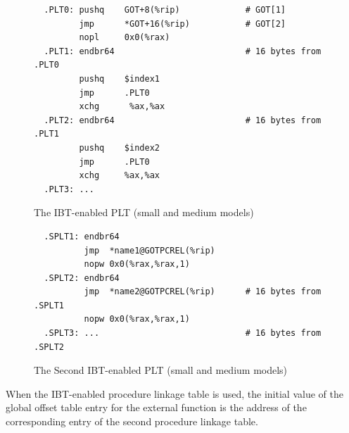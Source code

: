 \begin{figure}[H]
\Hrule
\caption{The IBT-enabled PLT (small and medium models)}
\label{ibt_small_med_plt}
\begin{footnotesize}
\begin{verbatim}
  .PLT0: pushq    GOT+8(%rip)             # GOT[1]
         jmp      *GOT+16(%rip)           # GOT[2]
         nopl     0x0(%rax)
  .PLT1: endbr64                          # 16 bytes from .PLT0
         pushq    $index1
         jmp      .PLT0
         xchg      %ax,%ax
  .PLT2: endbr64                          # 16 bytes from .PLT1
         pushq    $index2
         jmp      .PLT0
         xchg     %ax,%ax
  .PLT3: ...
\end{verbatim}
\end{footnotesize}
\Hrule
\end{figure}

\begin{figure}[H]
\Hrule
\caption{The Second IBT-enabled PLT (small and medium models)}
\label{ibt_sec_small_med_plt}
\begin{footnotesize}
\begin{verbatim}
  .SPLT1: endbr64
          jmp  *name1@GOTPCREL(%rip)
          nopw 0x0(%rax,%rax,1)
  .SPLT2: endbr64
          jmp  *name2@GOTPCREL(%rip)      # 16 bytes from .SPLT1
          nopw 0x0(%rax,%rax,1)
  .SPLT3: ...                             # 16 bytes from .SPLT2
\end{verbatim}
\end{footnotesize}
\Hrule
\end{figure}

When the IBT-enabled procedure linkage table is used, the initial value of
the global offset table entry for the external function is the address of
the corresponding entry of the second procedure linkage table.

